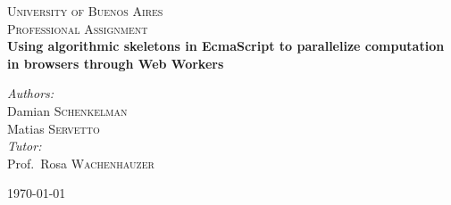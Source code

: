\begin{titlepage}
\begin{center}

\textsc{\LARGE University of Buenos Aires}\\[1.5cm]

\textsc{\Large Professional Assignment}\\[0.5cm]

{ \huge \bfseries Using algorithmic skeletons in EcmaScript to parallelize computation in browsers through Web Workers \\[0.4cm] }

\noindent

\emph{Authors:}\\
Damian \textsc{Schenkelman}\\
Matias \textsc{Servetto}\\[0.5cm]

\emph{Tutor:}\\
Prof.~Rosa \textsc{Wachenhauzer}

\vfill

{\large \today}

\end{center}
\end{titlepage}